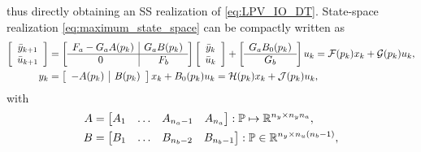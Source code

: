 thus directly obtaining an SS realization of \eqref{eq:LPV_IO_DT}. 
State-space realization \eqref{eq:maximum_state_space} can be compactly written as
\begin{subequations}
    \label{eq:maximum_ss_ABCD}
    \begin{align}\label{eq:maximum_ss_FcalGcal}
        \left[\begin{array}{c}
            \bar{y}_{k+1} \\
            \bar{u}_{k+1}
        \end{array}\right]
        &= 
        \left[\begin{array}{c|c}
            F_a - G_a A(p_k) & G_a B(p_k) \\
            \hline \hspace{-5pt} 
            0 & F_b
        \end{array}\right] 
        \left[\begin{array}{c}
            \bar{y}_{k} \\
            \bar{u}_{k}
        \end{array}\right]
        + 
        \left[\begin{array}{c}
        G_a B_0 (p_k) \\
        \hline
        G_b
        \end{array}\right]
        u_k
        = \mathcal{F}(p_k) x_k + \mathcal{G}(p_k) u_k, \\
        y_k &= \left[\begin{array}{c|c}
             -A(p_k) & B(p_k)
        \end{array}\right]
        x_k + B_0(p_k) u_k = \mathcal{H}(p_k) x_k + \mathcal{J}(p_k) u_k,
        \end{align}
\end{subequations}
with
\begin{subequations}
\begin{align}
    A &= \begin{bmatrix} A_1 & \hdots & A_{n_a-1} & A_{n_a} \end{bmatrix}: \mathbb{P} \mapsto \mathbb{R}^{n_y \times n_y n_a}, \label{eq:maximum_ss_A} \\
    B &= \begin{bmatrix} B_1 &  \hdots & B_{n_b-2} & B_{n_b-1} \end{bmatrix}: \mathbb{P} \in \mathbb{R}^{n_y \times n_u (n_b-1)}, \label{eq:maximum_ss_B}
\end{align}
\end{subequations}
